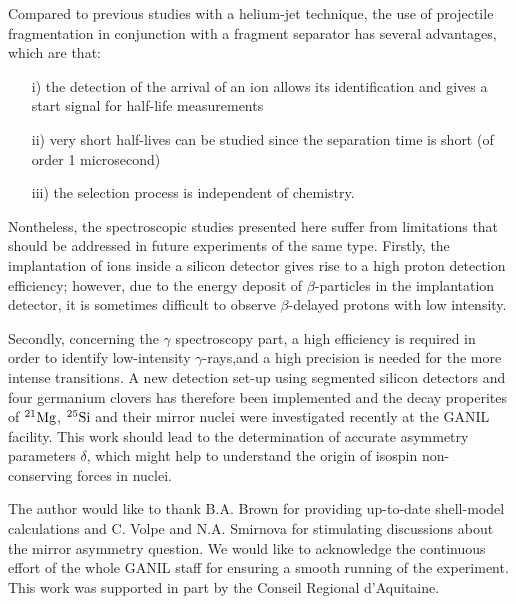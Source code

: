 \documentclass[a4paper]{article}
\begin{document}
Compared to previous studies with a helium-jet technique, the use of projectile fragmentation in conjunction with a fragment separator has several advantages, which are that:
\begin{itemize}
    \item[i)] the detection of the arrival of an ion allows its identification and gives a start signal for half-life measurements
    \item[ii)] very short half-lives can be studied since the separation time is short (of order 1 microsecond)
    \item[iii)] the selection process is independent of chemistry. 
\end{itemize}

Nontheless, the spectroscopic studies presented here suffer from limitations that should be addressed in future experiments of the same type. Firstly, the implantation of ions inside a silicon detector gives rise to a high proton detection efficiency; however, due to the energy deposit of $\beta$-particles in the implantation detector, it is sometimes difficult to observe $\beta$-delayed protons with low intensity.

Secondly, concerning the $\gamma$ spectroscopy part, a high efficiency is required in order to identify low-intensity $\gamma$-rays,and  a high precision is needed for the more intense transitions. A new detection set-up using segmented silicon detectors and four germanium clovers has therefore been implemented and the decay properites of $^{21}\textnormal{Mg}$, $^{25}\textnormal{Si}$ and their mirror nuclei were investigated recently at the GANIL facility. This work should lead to the determination of accurate asymmetry parameters $\delta$, which might help to understand the origin of isospin non-conserving forces in nuclei.

The author would like to thank B.A. Brown for providing up-to-date shell-model calculations and C. Volpe and N.A. Smirnova for stimulating discussions about the mirror asymmetry question. We would like to acknowledge the continuous effort of the whole GANIL staff for ensuring a smooth running of the experiment. This work was supported in part by the Conseil Regional d'Aquitaine.
\end{document}
